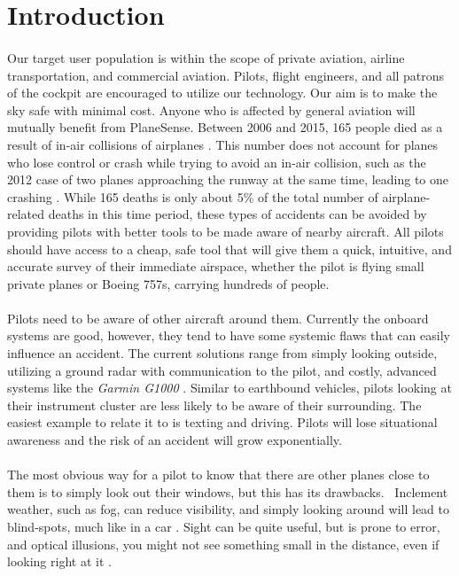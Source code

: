 \section{Introduction}
\paragraph{}
Our target user population is within the scope of private aviation, airline transportation, and commercial aviation. Pilots, flight engineers, and all patrons of the cockpit are encouraged to utilize our technology. Our aim is to make the sky safe with minimal cost. Anyone who is affected by general aviation will mutually benefit from PlaneSense. Between 2006 and 2015, 165 people died as a result of in-air collisions of airplanes \cite{Boeing}.  This number does not account for planes who lose control or crash while trying to avoid an in-air collision, such as the 2012 case of two planes approaching the runway at the same time, leading to one crashing \cite{brevard}.  While 165 deaths is only about 5\% of the total number of airplane-related deaths in this time period, these types of accidents can be avoided by providing pilots with better tools to be made aware of nearby aircraft.  All pilots should have access to a cheap, safe tool that will give them a quick, intuitive, and accurate survey of their immediate airspace, whether the pilot is flying small private planes or Boeing 757s, carrying hundreds of people.


\paragraph{}
Pilots need to be aware of other aircraft around them. Currently the onboard systems are good, however, they tend to have some systemic flaws that can easily influence an accident. The current solutions range from simply looking outside, utilizing a ground radar with communication to the pilot, and costly, advanced systems like the \textit{Garmin G1000} \cite{Garmin}. Similar to earthbound vehicles, pilots looking at their instrument cluster are less likely to be aware of their surrounding. The easiest example to relate it to is texting and driving. Pilots will lose situational awareness and the risk of an accident will grow exponentially.


\paragraph{}
The most obvious way for a pilot to know that there are other planes close to them is to simply look out their windows, but this has its drawbacks.  Inclement weather, such as fog, can reduce visibility, and simply looking around will lead to blind-spots, much like in a car \cite{LAX06LA056B}. Sight can be quite useful, but is prone to error, and optical illusions, you might not see something small in the distance, even if looking right at it \cite{Ken}. 


